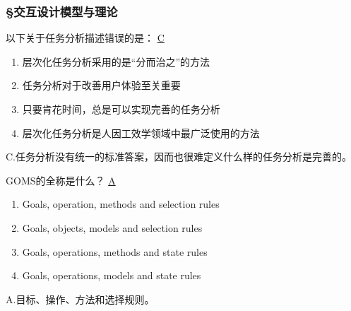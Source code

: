 \subsubsection*{\S 交互设计模型与理论}
\setcounter{problemname}{0}

\begin{problem}
	‍‌以下关于任务分析描述错误的是：
	\uline{C}    
        \begin{enumerate}[label=\Alph*.]
            \item 层次化任务分析采用的是“分而治之”的方法
            \item 任务分析对于改善用户体验至关重要
            \item 只要肯花时间，总是可以实现完善的任务分析
            \item 层次化任务分析是人因工效学领域中最广泛使用的方法
        \end{enumerate}
\end{problem}

\begin{solution}
C.任务分析没有统一的标准答案，因而也很难定义什么样的任务分析是完善的。
\end{solution}


\begin{problem}
	GOMS的全称是什么？
	\uline{A}    
    \vspace{-0.8em}
    \begin{multicols}{2}
        \begin{enumerate}[label=\Alph*.]
            \item Goals, operation, methods and selection rules
            \item Goals, objects, models and selection rules
            \item Goals, operations, methods and state rules
            \item Goals, operations, models and state rules
        \end{enumerate}
    \end{multicols}
    \vspace{-1em}
\end{problem}

\begin{solution}
A.目标、操作、方法和选择规则。
\end{solution}


